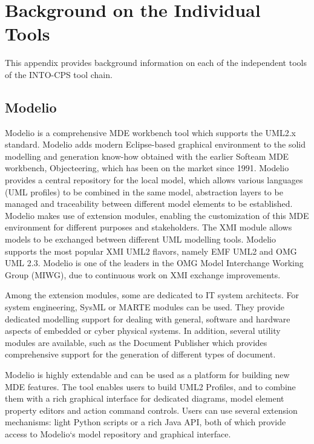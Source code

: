 \section{Background on the Individual Tools}
\label{appendix:tools}
This appendix provides background information on each of the independent tools of the INTO-CPS tool chain.
%
%
%
\subsection{Modelio}
Modelio is a comprehensive MDE \cite{Favre05} workbench tool which supports the UML2.x standard.
%
Modelio adds modern Eclipse-based graphical environment to the solid modelling and generation know-how obtained with the earlier Softeam MDE workbench, Objecteering, which has been on the market since 1991.
%
Modelio provides a central repository for the local model, which allows various languages (UML profiles) to be combined in the same model, abstraction layers to be managed and traceability between different model elements to be established.
%
Modelio makes use of extension modules, enabling the customization of this MDE environment for different purposes and stakeholders.
%
The XMI module allows models to be exchanged between different UML modelling tools.
%
Modelio supports the most popular XMI UML2 flavors, namely EMF UML2 and OMG UML 2.3.
%
Modelio is one of the leaders in the OMG Model Interchange Working Group (MIWG), due to continuous work on XMI exchange improvements.

Among the extension modules, some are dedicated to IT system architects.
%
For system engineering, SysML or MARTE modules can be used.
%
They provide dedicated modelling support for dealing with general, software and hardware aspects of embedded or cyber physical systems.
%
In addition, several utility modules are available, such as the Document Publisher which provides comprehensive support for the generation of different types of document.

Modelio is highly extendable and can be used as a platform for building new MDE features.
%
The tool enables users to build UML2 Profiles, and to combine them with a rich graphical interface for dedicated diagrams, model element property editors and action command controls.
%
Users can use several extension mechanisms: light Python scripts or a rich Java API, both of which provide access to Modelio‘s  model repository and graphical interface.
%
%
%

